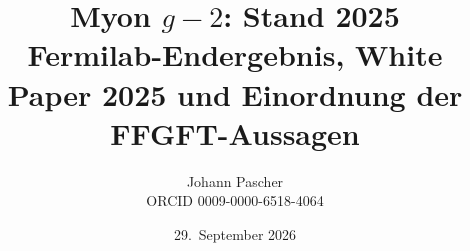 \documentclass[11pt,a4paper]{report}
\title{Myon $g-2$: Stand 2025\\[0.5em]
  \large Fermilab-Endergebnis, White Paper 2025 und Einordnung der FFGFT-Aussagen}
\date{29.~September 2026}
\author{Johann Pascher\\\small ORCID 0009-0000-6518-4064}
\begin{document}
\renewcommand{\thechapter}{}
\renewcommand{\thesection}{\arabic{section}}
\maketitle
\tableofcontents

\end{document}
